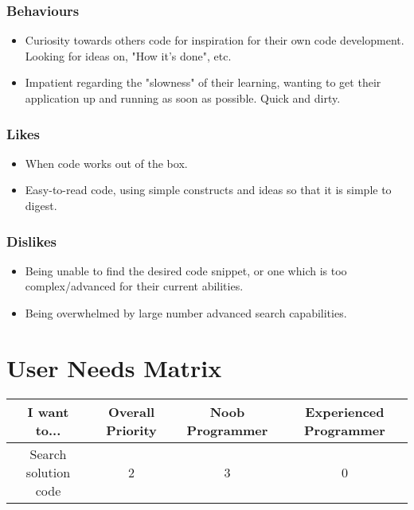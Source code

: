 \documentclass[11pt]{article}
\begin{document}
\subsubsection{Behaviours}

\begin{itemize}
\item Curiosity towards others code for inspiration for their own code
development. Looking for ideas on, "How it's done", etc.
\item Impatient regarding the "slowness" of their learning, wanting to
get their application up and running as soon as possible. Quick and
dirty.
\end{itemize}

\subsubsection{Likes}

\begin{itemize}
\item When code works out of the box.
\item Easy-to-read code, using simple constructs and ideas so that it
is simple to digest.
\end{itemize}

\subsubsection{Dislikes}

\begin{itemize}
\item Being unable to find the desired code snippet, or one which is
too complex/advanced for their current abilities.
\item Being overwhelmed by large number advanced search capabilities.
\end{itemize}

\section{User Needs Matrix}

\begin{tabular}{*{4}{|c}|}
\hline
I want to... & Overall Priority & Noob Programmer &
    Experienced Programmer \\
\hline
Search solution code & 2 & 3 & 0 \\
\hline
\end{tabular}
\end{document}
